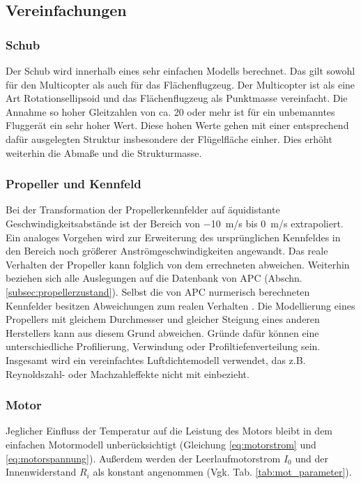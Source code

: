 \subsection{Vereinfachungen}
\subsubsection{Schub}
Der Schub wird innerhalb eines sehr einfachen Modells berechnet. Das gilt sowohl für den Multicopter als auch für das Flächenflugzeug. Der Multicopter ist als eine Art Rotationsellipsoid und das Flächenflugzeug als Punktmasse vereinfacht. Die Annahme so hoher Gleitzahlen von ca. 20 oder mehr ist für ein unbemanntes Fluggerät ein sehr hoher Wert. Diese hohen Werte gehen mit einer entsprechend dafür ausgelegten Struktur insbesondere der Flügelfläche einher. Dies erhöht weiterhin die Abmaße und die Strukturmasse.

\subsubsection{Propeller und Kennfeld}
Bei der Transformation der Propellerkennfelder auf äquidistante Geschwindigkeitsabstände ist der Bereich von \SI{-10}{m/s} bis \SI{0}{m/s} extrapoliert. Ein analoges Vorgehen wird zur Erweiterung des ursprünglichen Kennfeldes in den Bereich noch größerer Anströmgeschwindigkeiten angewandt. Das reale Verhalten der Propeller kann folglich von dem errechneten abweichen. Weiterhin beziehen sich alle Auslegungen auf die Datenbank von APC (Abschn. \ref{subsec:propellerzustand})\cite{apc}. Selbst die von APC nurmerisch berechneten Kennfelder besitzen Abweichungen zum realen Verhalten \cite{apc.theory}.
Die Modellierung eines Propellers mit gleichem Durchmesser und gleicher Steigung eines anderen Herstellers kann aus diesem Grund abweichen. Gründe dafür können eine unterschiedliche Profilierung, Verwindung oder Profiltiefenverteilung sein. Insgesamt wird ein vereinfachtes Luftdichtemodell verwendet, das z.B. Reynoldszahl- oder Machzahleffekte nicht mit einbezieht.

\subsubsection{Motor}
Jeglicher Einfluss der Temperatur auf die Leistung des Motors bleibt in dem einfachen Motormodell unberücksichtigt (Gleichung \eqref{eq:motorstrom} und \eqref{eq:motorspannung}). Außerdem werden der Leerlaufmotorstrom \ensuremath{I_{0}} und der Innenwiderstand \ensuremath{R_{i}} als konstant angenommen (Vgk. Tab. \ref{tab:mot_parameter}).

